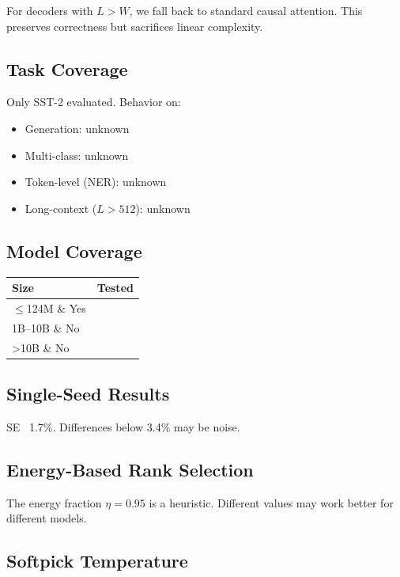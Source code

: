 For decoders with $L > W$, we fall back to standard causal attention. This 
preserves correctness but sacrifices linear complexity.

\subsection{Task Coverage}

Only SST-2 evaluated. Behavior on:
\begin{itemize}
\item Generation: unknown
\item Multi-class: unknown
\item Token-level (NER): unknown
\item Long-context ($L > 512$): unknown

\end{itemize}
\subsection{Model Coverage}

\begin{table}[H]
\centering
\small
\begin{tabular}{ll}
\toprule
\textbf{Size} & \textbf{Tested} \\
\midrule
$\le$124M \& Yes \\
1B--10B \& No \\
\textgreater{}10B \& No \\
\bottomrule
\end{tabular}
\end{table}

\subsection{Single-Seed Results}

SE ~1.7\%. Differences below 3.4\% may be noise.

\subsection{Energy-Based Rank Selection}

The energy fraction $\eta = 0.95$ is a heuristic. Different values may 
work better for different models.

\subsection{Softpick Temperature}

